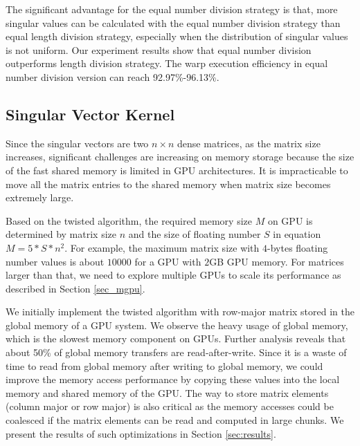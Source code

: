 The significant advantage for the equal number division strategy is that, more singular values can be calculated with the equal number division strategy than equal length division strategy, especially when the distribution of singular values is not uniform.
Our experiment results show that equal number division outperforms length division strategy.
The warp execution efficiency in equal number division version can reach 92.97\%-96.13\%.

\vspace{-0.1in}
\subsection{Singular Vector Kernel} \label{sec_svector}
\vspace{-0.1in}
Since the singular vectors are two $n\times n$ dense matrices, as the matrix size increases, significant challenges are increasing on memory storage because the size of the fast shared memory is limited in GPU architectures.
It is impracticable to move all the matrix entries to the shared memory when matrix size becomes extremely large.

Based on the twisted algorithm, the required memory size $M$ on GPU is determined by matrix size $n$ and the size of floating number $S$ in equation $M = 5 * S * n^2$.
For example, the maximum matrix size with $4$-bytes floating number values is about $10000$ for a GPU with $2$GB GPU memory. 
For matrices larger than that, we need to explore multiple GPUs to scale its performance as described in Section \ref{sec_mgpu}.

We initially implement the twisted algorithm with row-major matrix stored in the global memory
of a GPU system. 
We observe the heavy usage of global memory, which is
the slowest memory component on GPUs. 
Further analysis reveals that about 50\% of global memory transfers are read-after-write. Since it is a waste of time to read from global memory after writing to global memory,
we could improve the memory access performance by copying these values into the local memory and shared memory of the GPU.
The way to store matrix elements (column major or row major) is also critical as the memory accesses could be coalesced if the matrix elements
can be read and computed in large chunks. We present the results
of such optimizations in Section \ref{sec:results}.

